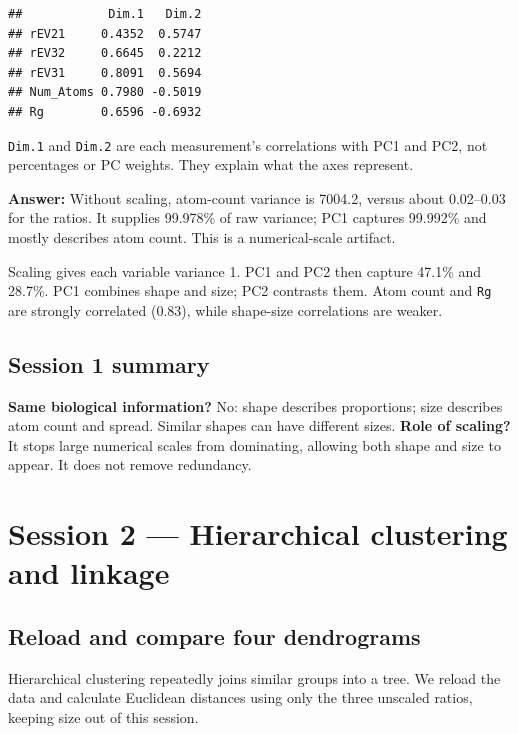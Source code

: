 \documentclass[
  10pt,
]{article}
\begin{document}
\begin{verbatim}
##            Dim.1   Dim.2
## rEV21     0.4352  0.5747
## rEV32     0.6645  0.2212
## rEV31     0.8091  0.5694
## Num_Atoms 0.7980 -0.5019
## Rg        0.6596 -0.6932
\end{verbatim}

\texttt{Dim.1} and \texttt{Dim.2} are each measurement's correlations
with PC1 and PC2, not percentages or PC weights. They explain what the
axes represent.

\textbf{Answer:} Without scaling, atom-count variance is 7004.2, versus
about 0.02--0.03 for the ratios. It supplies 99.978\% of raw variance;
PC1 captures 99.992\% and mostly describes atom count. This is a
numerical-scale artifact.

Scaling gives each variable variance 1. PC1 and PC2 then capture 47.1\%
and 28.7\%. PC1 combines shape and size; PC2 contrasts them. Atom count
and \texttt{Rg} are strongly correlated (0.83), while shape-size
correlations are weaker.

\subsection{Session 1 summary}\label{session-1-summary}

\textbf{Same biological information?} No: shape describes proportions;
size describes atom count and spread. Similar shapes can have different
sizes. \textbf{Role of scaling?} It stops large numerical scales from
dominating, allowing both shape and size to appear. It does not remove
redundancy.

\section{Session 2 --- Hierarchical clustering and
linkage}\label{session-2-hierarchical-clustering-and-linkage}

\subsection{Reload and compare four
dendrograms}\label{reload-and-compare-four-dendrograms}

Hierarchical clustering repeatedly joins similar groups into a tree. We
reload the data and calculate Euclidean distances using only the three
unscaled ratios, keeping size out of this session.
\end{document}
